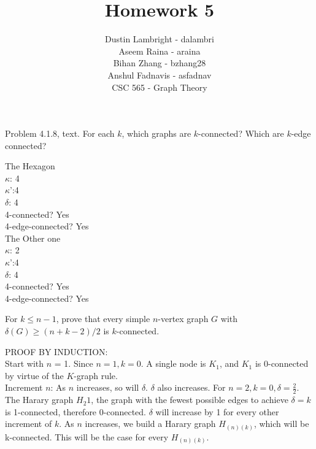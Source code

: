 \documentclass[12pt]{article}
\newenvironment{question}[2][Question]{\begin{trivlist}
\item[\hskip \labelsep {\bfseries #1}\hskip \labelsep {\bfseries #2.}]}{\end{trivlist}}
\begin{document}


\title{Homework 5}%
\author{Dustin Lambright - dalambri \\ Aseem Raina - araina \\ Bihan Zhang - bzhang28 \\ Anshul Fadnavis - asfadnav\\
CSC 565 - Graph Theory} %

\maketitle


\begin{question}{1}
Problem 4.1.8, text. For each $k$, which graphs are $k$-connected? Which are $k$-edge connected?
\end{question}

\noindent
The Hexagon \\
$\kappa$: 4 \\
$\kappa$':4 \\
$\delta$: 4 \\
4-connected? Yes \\
4-edge-connected? Yes  \\
The Other one \\
$\kappa$: 2 \\
$\kappa$':4 \\
$\delta$: 4 \\
4-connected? Yes \\
4-edge-connected? Yes

\begin{question}{2}
For $k \leq n - 1$, prove that every simple $n$-vertex graph $G$ with $\delta(G) \geq (n+k-2)/2$ is $k$-connected.
\end{question}

PROOF BY INDUCTION: \\
Start with $n$ = 1. Since $n = 1, k = 0$. A single node is $K_1$, and $K_1$ is $0$-connected by virtue of the $K$-graph rule. \\

Increment $n$:
As $n$ increases, so will $\delta$.  $\delta$ also increases. For $n = 2, k =0, \delta = \frac{2}{2}$.  The Harary graph $H_{2}{1}$, the graph with the fewest possible edges to achieve $\delta = k$ is 1-connected, therefore 0-connected.  $\delta$ will increase by 1 for every other increment of $k$. As $n$ increases, we build a Harary graph $H_{(n)(k)}$, which will be k-connected.  This will be the case for every $H_{(n)(k)}$.
\end{document}
